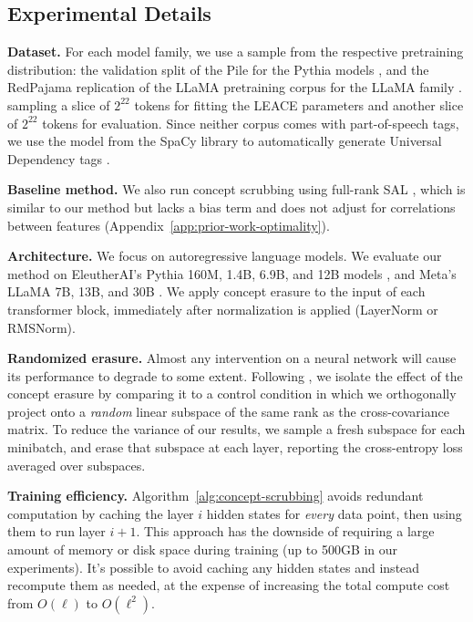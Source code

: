 \documentclass{article}
\theoremstyle{plain}
\theoremstyle{remark}
\theoremstyle{plain}
\theoremstyle{TheoremNum}
\begin{document}
\subsection{Experimental Details}

\textbf{Dataset.} For each model family, we use a sample from the respective pretraining distribution: the validation split of the Pile \cite{gao2020pile} for the Pythia models \cite{biderman2023pythia}, and the RedPajama replication of the LLaMA pretraining corpus for the LLaMA family \cite{touvron2023llama}. sampling a slice of $2^{22}$ tokens for fitting the LEACE parameters and another slice of $2^{22}$ tokens for evaluation. Since neither corpus comes with part-of-speech tags, we use the  model from the SpaCy library \cite{honnibal2020spacy} to automatically generate Universal Dependency tags \cite{mcdonald2013universal}.

\textbf{Baseline method.} We also run concept scrubbing using full-rank SAL \cite{shao-etal-2023-gold}, which is similar to our method but lacks a bias term and does not adjust for correlations between features (Appendix~\ref{app:prior-work-optimality}).

\textbf{Architecture.} We focus on autoregressive language models. We evaluate our method on EleutherAI's Pythia 160M, 1.4B, 6.9B, and 12B models \cite{biderman2023pythia}, and Meta's LLaMA 7B, 13B, and 30B \cite{touvron2023llama}. We apply concept erasure to the input of each transformer block, immediately after normalization is applied (LayerNorm or RMSNorm). 

\textbf{Randomized erasure.} Almost any intervention on a neural network will cause its performance to degrade to some extent. Following \citet{elazar2021amnesic}, we isolate the effect of the concept erasure by comparing it to a control condition in which we orthogonally project onto a \emph{random} linear subspace of the same rank as the cross-covariance matrix. To reduce the variance of our results, we sample a fresh subspace for each minibatch, and erase that subspace at each layer, reporting the cross-entropy loss averaged over subspaces.

\textbf{Training efficiency.} Algorithm~\ref{alg:concept-scrubbing} avoids redundant computation by caching the layer $i$ hidden states for \emph{every} data point, then using them to run layer $i + 1$. This approach has the downside of requiring a large amount of memory or disk space during training (up to 500GB in our experiments). It's possible to avoid caching any hidden states and instead recompute them as needed, at the expense of increasing the total compute cost from $O(\ell)$ to $O(\ell^2)$.
\end{document}
